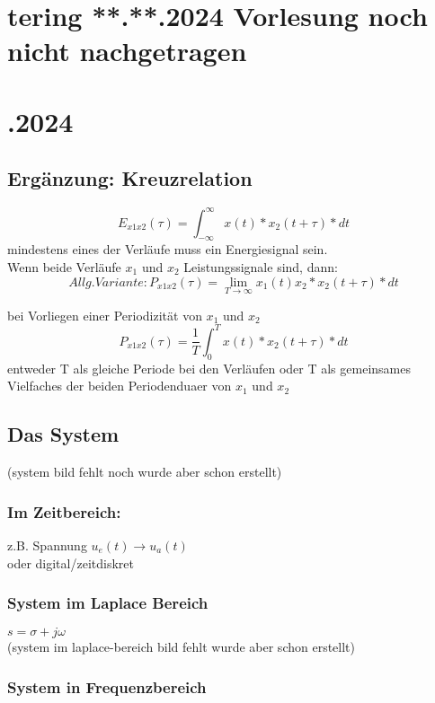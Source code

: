 \documentclass{article}
\begin{document}
\section*{\cen  tering **.**.2024 Vorlesung noch nicht nachgetragen}

\newpage
\section*{.2024}
\subsection*{\centering Ergänzung: Kreuzrelation}

\[
    E_{x1x2}(\tau)=\int_{-\infty}^{\infty}x(t)*x_2(t+\tau)*dt
\]
mindestens eines der Verläufe muss ein Energiesignal sein. \\
Wenn beide Verläufe $x_1$ und $x_2$ Leistungssignale sind, dann:
\[
    Allg. Variante: P_{x1x2}(\tau)=\lim_{T\to\infty}x_1(t)x_2*x_2(t+\tau)*dt
\]

    bei Vorliegen einer Periodizität von $x_1$ und $x_2$
\[
    P_{x1x2}(\tau)=\frac{1}{T}\int_{0}^{T}x(t)*x_2(t+\tau)*dt
\]
entweder T als gleiche Periode bei den Verläufen oder T als gemeinsames Vielfaches der beiden Periodenduaer von $x_1$ und $x_2$

\subsection*{\centering Das System}
(system bild fehlt noch wurde aber schon erstellt)

\subsubsection*{\centering Im Zeitbereich:}
z.B. Spannung $u_e(t) \to u_a(t)$ \\
oder digital/zeitdiskret

\subsubsection*{\centering System im Laplace Bereich}
$s=\sigma+j\omega$ \\
(system im laplace-bereich bild fehlt wurde aber schon erstellt)

\subsubsection*{\centering System in Frequenzbereich}
\end{document}
